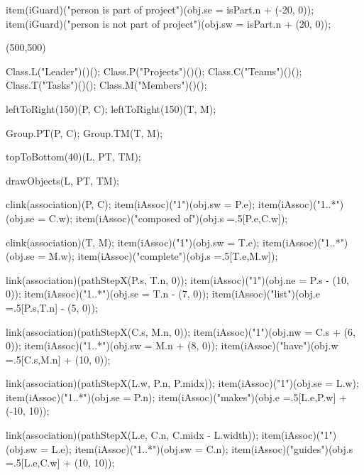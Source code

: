 \begin{empfile}
\begin{empdef}[activityR4]
item(iGuard)("person is part of project")(obj.se = isPart.n + (-20, 0));
item(iGuard)("person is not part of project")(obj.sw = isPart.n + (20, 0));
\end{empdef}

\begin{empdef}[erdiag](500,500)

Class.L("Leader")()();
Class.P("Projects")()();
Class.C("Teams")()();
Class.T("Tasks")()();
Class.M("Members")()();

leftToRight(150)(P, C);
leftToRight(150)(T, M);

Group.PT(P, C);
Group.TM(T, M);

topToBottom(40)(L, PT, TM);



drawObjects(L, PT, TM);

clink(association)(P, C);
item(iAssoc)("1")(obj.sw = P.e);
item(iAssoc)("1..*")(obj.se = C.w);
item(iAssoc)("composed of")(obj.s =.5[P.e,C.w]);

clink(association)(T, M);
item(iAssoc)("1")(obj.sw = T.e);
item(iAssoc)("1..*")(obj.se = M.w);
item(iAssoc)("complete")(obj.s =.5[T.e,M.w]);

link(association)(pathStepX(P.s, T.n, 0));
item(iAssoc)("1")(obj.ne = P.s - (10, 0));
item(iAssoc)("1..*")(obj.se = T.n - (7, 0));
item(iAssoc)("list")(obj.e =.5[P.s,T.n] - (5, 0));

link(association)(pathStepX(C.s, M.n, 0));
item(iAssoc)("1")(obj.nw = C.s + (6, 0));
item(iAssoc)("1..*")(obj.sw = M.n + (8, 0));
item(iAssoc)("have")(obj.w =.5[C.s,M.n] + (10, 0));

link(association)(pathStepX(L.w, P.n, P.midx));
item(iAssoc)("1")(obj.se = L.w);
item(iAssoc)("1..*")(obj.se = P.n);
item(iAssoc)("makes")(obj.e =.5[L.e,P.w] + (-10, 10));

link(association)(pathStepX(L.e, C.n, C.midx - L.width));
item(iAssoc)("1")(obj.sw = L.e);
item(iAssoc)("1..*")(obj.sw = C.n);
item(iAssoc)("guides")(obj.s =.5[L.e,C.w] + (10, 10));

\end{empdef}

\end{empfile}